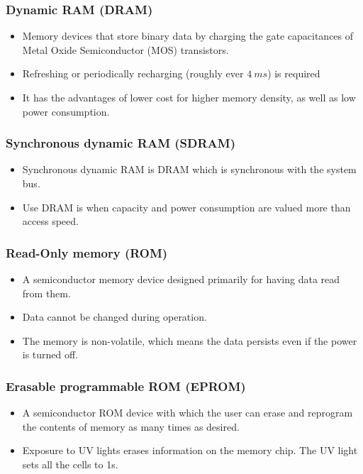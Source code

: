 \documentclass[11pt]{article}
\begin{document}
\subsubsection{Dynamic RAM (DRAM)}
\label{sec:org25dfa37}
\begin{itemize}
\item Memory devices that store binary data by charging the gate capacitances of Metal Oxide Semiconductor (MOS) transistors.
\item Refreshing or periodically recharging (roughly ever \(\qty{4}{ms}\)) is required
\item It has the advantages of lower cost for higher memory density, as well as low power consumption.
\end{itemize}

\subsubsection{Synchronous dynamic RAM (SDRAM)}
\label{sec:org43f64cd}
\begin{itemize}
\item Synchronous dynamic RAM is DRAM which is synchronous with the system bus.
\item Use DRAM is when capacity and power consumption are valued more than access speed.
\end{itemize}

\subsubsection{Read-Only memory (ROM)}
\label{sec:orgaa23855}
\begin{itemize}
\item A semiconductor memory device designed primarily for having data read from them.
\item Data cannot be changed during operation.
\item The memory is non-volatile, which means the data persists even if the power is turned off.
\end{itemize}

\subsubsection{Erasable programmable ROM (EPROM)}
\label{sec:org655180e}
\begin{itemize}
\item A semiconductor ROM device with which the user can erase and reprogram the contents of memory as many times as desired.
\item Exposure to UV lights erases information on the memory chip. The UV light sets all the cells to 1s.
\end{itemize}
\end{document}

